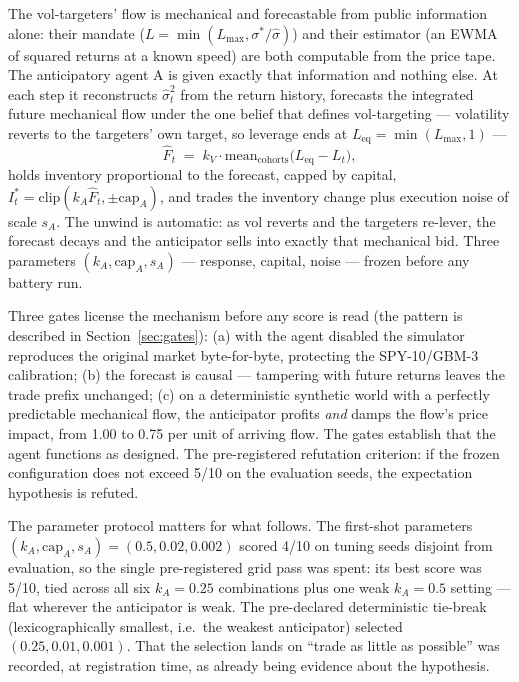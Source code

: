 \documentclass[11pt]{article}
\begin{document}
The vol-targeters' flow is mechanical and forecastable from public information
alone: their mandate ($L = \min(L_{\max},\sigma^*/\hat\sigma)$) and their
estimator (an EWMA of squared returns at a known speed) are both computable
from the price tape. The anticipatory agent A is given exactly that information and nothing
else. At each step it reconstructs $\hat\sigma^2_t$ from the return
history, forecasts the integrated future mechanical flow under the one belief
that defines vol-targeting --- volatility reverts to the targeters' own
target, so leverage ends at $L_{\mathrm{eq}} = \min(L_{\max}, 1)$ ---
%
\begin{equation}
\hat F_t \;=\; k_V \cdot \mathrm{mean}_{\mathrm{cohorts}}\bigl(L_{\mathrm{eq}} - L_t\bigr),
\label{eq:forecast}
\end{equation}
%
holds inventory proportional to the forecast, capped by capital,
$I^*_t = \mathrm{clip}(k_A \hat F_t, \pm \mathrm{cap}_A)$, and trades the
inventory change plus execution noise of scale $s_A$. The unwind is automatic:
as vol reverts
and the targeters re-lever, the forecast decays and the anticipator sells into
exactly that mechanical bid. Three parameters
$(k_A, \mathrm{cap}_A, s_A)$ --- response, capital, noise --- frozen before
any battery run.

Three gates license the mechanism before any score is read (the pattern is
described in Section~\ref{sec:gates}): (a) with the agent disabled the
simulator reproduces the original market byte-for-byte, protecting the
SPY-10/GBM-3 calibration; (b) the forecast is causal --- tampering with future
returns leaves the trade prefix unchanged; (c) on a deterministic synthetic
world with a perfectly predictable mechanical flow, the anticipator profits
\emph{and} damps the flow's price impact, from 1.00 to 0.75 per unit of
arriving flow. The gates establish that the agent functions as designed.
The pre-registered
refutation criterion: if the frozen configuration does not exceed 5/10 on the
evaluation seeds, the expectation hypothesis is refuted.

The parameter protocol matters for what follows. The first-shot parameters
$(k_A, \mathrm{cap}_A, s_A) = (0.5, 0.02, 0.002)$ scored 4/10 on tuning seeds
disjoint from evaluation, so the single pre-registered grid pass was spent:
its best score was 5/10, tied across all six $k_A = 0.25$ combinations plus
one weak $k_A = 0.5$ setting --- flat wherever the anticipator is weak. The
pre-declared deterministic tie-break (lexicographically smallest, i.e.\ the
weakest anticipator) selected $(0.25, 0.01, 0.001)$. That the selection lands
on ``trade as little as possible'' was recorded, at registration time, as
already being evidence about the hypothesis.
\end{document}
